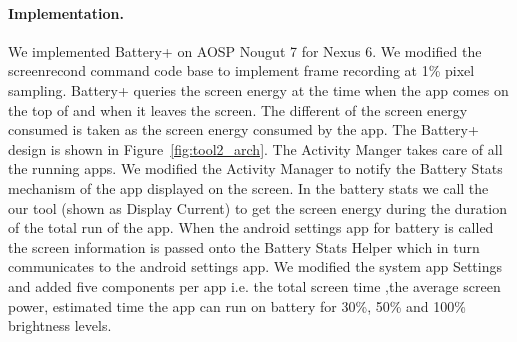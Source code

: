 \paragraph{Implementation.}
We implemented Battery+ on AOSP Nougut 7 for Nexus 6.
We modified the screenrecond command code base to implement
frame recording at 1\% pixel sampling.
Battery+ queries the screen energy at the time when the app comes on
the top of and when it leaves the screen.
The different of the screen energy consumed is taken as the screen energy
consumed by the app.
The Battery+ design is shown in Figure~\ref{fig:tool2_arch}.
The Activity Manger takes care of all the running apps.
We modified the Activity Manager to notify the Battery Stats mechanism of
the app displayed on the screen.
In the battery stats we call the our tool (shown as Display Current)
to get the screen energy during the duration of the total run of the app.
When the android settings app for battery is called the screen information is
passed onto the Battery Stats Helper which in turn communicates to the android settings app.
We modified the system app Settings and added five components per app i.e.
the total screen time ,the average screen power, estimated time the app can run on battery
for 30\%, 50\% and 100\% brightness levels.


\fi

